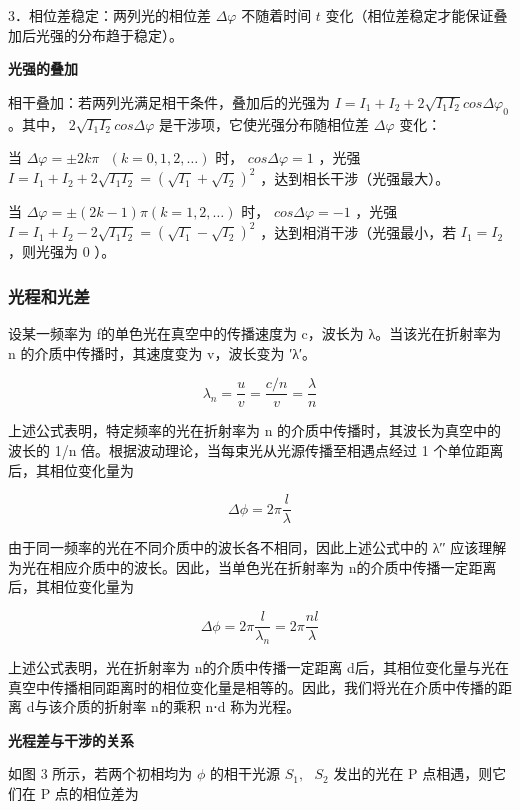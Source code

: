 \documentclass[
]{article}
\begin{document}
3．相位差稳定：两列光的相位差 \(\Delta\varphi\) 不随着时间 \(t\)
变化（相位差稳定才能保证叠加后光强的分布趋于稳定）。

\textbf{光强的叠加}

相干叠加：若两列光满足相干条件，叠加后的光强为
\(I = I_{1} + I_{2} + 2\sqrt{I_{1}I_{2}}cos\Delta\varphi_{0}\) 。其中，
\(2\sqrt{I_{1}I_{2}}cos\Delta\varphi\) 是干涉项，它使光强分布随相位差
\(\Delta\varphi\) 变化：

当 \(\Delta\varphi = \pm 2k\pi\text{\ }(k = 0,1,2,\ldots)\) 时，
\(cos\Delta\varphi = 1\) ，光强
\(I = I_{1} + I_{2} + 2\sqrt{I_{1}I_{2}} = \left( \sqrt{I_{1}} + \sqrt{I_{2}} \right)^{2}\)
，达到相长干涉（光强最大）。

当 \(\Delta\varphi = \pm (2k - 1)\pi(k = 1,2,\ldots)\) 时，
\(cos\Delta\varphi = - 1\) ，光强
\(I = I_{1} + I_{2} - 2\sqrt{I_{1}I_{2}} = \left( \sqrt{I_{1}} - \sqrt{I_{2}} \right)^{2}\)
，达到相消干涉（光强最小，若 \(I_{1} = I_{2}\) ，则光强为 0 ）。

\hypertarget{ux5149ux7a0bux548cux5149ux5dee}{%
\subsubsection{光程和光差}\label{ux5149ux7a0bux548cux5149ux5dee}}

设某一频率为 f的单色光在真空中的传播速度为 c，波长为 λ。当该光在折射率为
n 的介质中传播时，其速度变为 v，波长变为 ′λ′。

\[\lambda_{n} = \frac{u}{v} = \frac{c/n}{v} = \frac{\lambda}{n}\]

上述公式表明，特定频率的光在折射率为 n
的介质中传播时，其波长为真空中的波长的 1/n\hspace{0pt}
倍。根据波动理论，当每束光从光源传播至相遇点经过 1
个单位距离后，其相位变化量为

\[\Delta\phi = 2\pi\frac{l}{\lambda}\]

由于同一频率的光在不同介质中的波长各不相同，因此上述公式中的 λ′′
应该理解为光在相应介质中的波长。因此，当单色光在折射率为
n的介质中传播一定距离后，其相位变化量为

\[\Delta\phi = 2\pi\frac{l}{\lambda_{n}} = 2\pi\frac{nl}{\lambda}\]

上述公式表明，光在折射率为 n的介质中传播一定距离
d后，其相位变化量与光在真空中传播相同距离时的相位变化量是相等的。因此，我们将光在介质中传播的距离
d与该介质的折射率 n的乘积 n⋅d 称为光程。

\textbf{光程差与干涉的关系}

如图 3 所示，若两个初相均为 \(\phi\) 的相干光源 \(S_{1},\text{\ }S_{2}\)
发出的光在 P 点相遇，则它们在 P 点的相位差为
\end{document}
